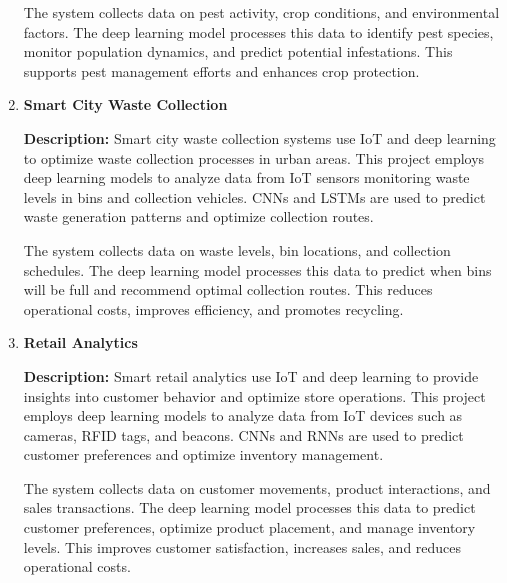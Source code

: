 \documentclass{article}
\begin{document}
\begin{enumerate}[label=\textbf{\arabic*.}, leftmargin=*]
The system collects data on pest activity, crop conditions, and environmental factors. The deep learning model processes this data to identify pest species, monitor population dynamics, and predict potential infestations. This supports pest management efforts and enhances crop protection.



\vspace{24pt} %
\item \textbf{Smart City Waste Collection}

\textbf{Description:}
Smart city waste collection systems use IoT and deep learning to optimize waste collection processes in urban areas. This project employs deep learning models to analyze data from IoT sensors monitoring waste levels in bins and collection vehicles. CNNs and LSTMs are used to predict waste generation patterns and optimize collection routes.

The system collects data on waste levels, bin locations, and collection schedules. The deep learning model processes this data to predict when bins will be full and recommend optimal collection routes. This reduces operational costs, improves efficiency, and promotes recycling.



\vspace{24pt} %
\item \textbf{Retail Analytics}

\textbf{Description:}
Smart retail analytics use IoT and deep learning to provide insights into customer behavior and optimize store operations. This project employs deep learning models to analyze data from IoT devices such as cameras, RFID tags, and beacons. CNNs and RNNs are used to predict customer preferences and optimize inventory management.

The system collects data on customer movements, product interactions, and sales transactions. The deep learning model processes this data to predict customer preferences, optimize product placement, and manage inventory levels. This improves customer satisfaction, increases sales, and reduces operational costs.




\end{enumerate}
\end{document}
